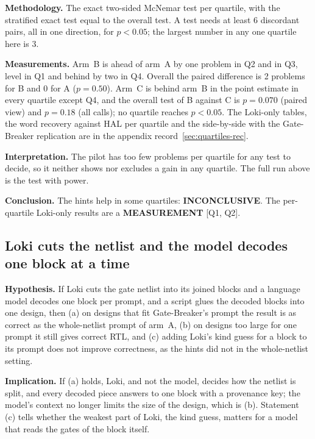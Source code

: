 \documentclass[conference]{IEEEtran}
\newcommand{\verdict}[1]{\textbf{\textsc{#1}}}
\newcommand{\hev}[1]{\par\smallskip\noindent\textbf{#1}}
\begin{document}
\hev{Methodology.} The exact two-sided McNemar test per quartile, with the stratified exact test equal to the overall test. A test needs at least 6 discordant pairs, all in one direction, for $p<0.05$; the largest number in any one quartile here is 3.

\hev{Measurements.} Arm~B is ahead of arm~A by one problem in Q2 and in Q3, level in Q1 and behind by two in Q4. Overall the paired difference is 2 problems for B and 0 for A ($p=0.50$). Arm~C is behind arm~B in the point estimate in every quartile except Q4, and the overall test of B against C is $p=0.070$ (paired view) and $p=0.18$ (all calls); no quartile reaches $p<0.05$. The Loki-only tables, the word recovery against HAL per quartile and the side-by-side with the Gate-Breaker replication are in the appendix record~\ref{sec:quartiles-rec}.

\hev{Interpretation.} The pilot has too few problems per quartile for any test to decide, so it neither shows nor excludes a gain in any quartile. The full run above is the test with power.

\hev{Conclusion.} The hints help in some quartiles: \verdict{INCONCLUSIVE}. The per-quartile Loki-only results are a \verdict{MEASUREMENT} [Q1, Q2].

\subsection{Loki cuts the netlist and the model decodes one block at a time}
\label{arg:la5}
\label{sec:ql10}

\hev{Hypothesis.} If Loki cuts the gate netlist into its joined blocks and a language model decodes one block per prompt, and a script glues the decoded blocks into one design, then (a) on designs that fit Gate-Breaker's prompt the result is as correct as the whole-netlist prompt of arm~A, (b) on designs too large for one prompt it still gives correct RTL, and (c) adding Loki's kind guess for a block to its prompt does not improve correctness, as the hints did not in the whole-netlist setting.

\hev{Implication.} If (a) holds, Loki, and not the model, decides how the netlist is split, and every decoded piece answers to one block with a provenance key; the model's context no longer limits the size of the design, which is (b). Statement (c) tells whether the weakest part of Loki, the kind guess, matters for a model that reads the gates of the block itself.
\end{document}
